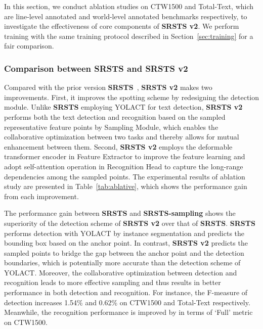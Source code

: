 In this section, we conduct ablation studies on CTW1500 and Total-Text, which are line-level annotated and world-level annotated benchmarks respectively, to investigate the effectiveness of core components of \textbf{SRSTS v2}. We perform training with the same training protocol described in Section~\ref{sec:training} for a fair comparison.




\subsubsection{Comparison between \textbf{SRSTS} and \textbf{SRSTS v2}}
\label{sec: comparison}

Compared with the prior version \textbf{SRSTS}~\cite{wu2022decoupling}, \textbf{SRSTS v2} makes two improvements. First, it improves the spotting scheme by redesigning the detection module. Unlike \textbf{SRSTS} employing YOLACT for text detection, \textbf{SRSTS v2} performs both the text detection and recognition based on the sampled representative feature points by Sampling Module, which enables the collaborative optimization between two tasks and thereby allows for mutual enhancement between them. Second, \textbf{SRSTS v2} employs the deformable transformer encoder in Feature Extractor to improve the feature learning and adopt self-attention operation in Recognition Head  to capture the long-range dependencies among the sampled points. The experimental results of ablation study are presented in Table~\ref{tab:ablative}, which shows the performance gain from each improvement.

The performance gain between \textbf{SRSTS} and \textbf{SRSTS-sampling} shows the superiority of the detection scheme of \textbf{SRSTS v2} over that of \textbf{SRSTS}. \textbf{SRSTS} performs detection with YOLACT by instance segmentation and predicts the bounding box based on the anchor point. In contrast, \textbf{SRSTS v2} predicts the sampled points to bridge the gap between the anchor point and the detection boundaries, which is potentially more accurate than the detection scheme of YOLACT. Moreover, the collaborative optimization between detection and recognition leads to more effective sampling and thus results in better performance in both detection and recognition. For instance, the F-measure of detection increases 1.54\% and 0.62\% on CTW1500 and Total-Text respectively. Meanwhile, the recognition performance is improved by  in terms of `Full' metric on CTW1500.





